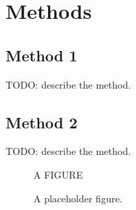 \chapter{Methods}\label{chap:methods}

\section{Method 1}

TODO: describe the method.

\section{Method 2}

TODO: describe the method. \cite{somearticle}

\begin{figure}[ht]
    \centering
    A FIGURE
    \caption{A placeholder figure.}
    \label{fig:placeholder}
\end{figure}
